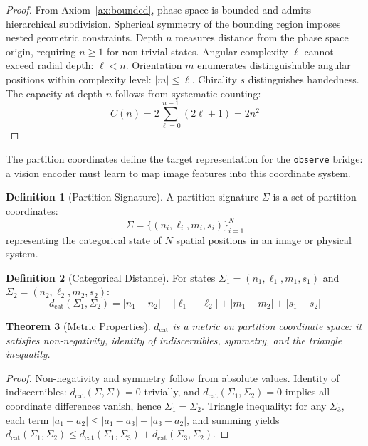 \documentclass[11pt,twocolumn,a4paper]{article}
\newtheorem{theorem}{Theorem}[section]
\theoremstyle{definition}
\newtheorem{definition}[theorem]{Definition}
\theoremstyle{remark}
\newcommand{\dcat}{d_{\mathrm{cat}}}
\newcommand{\Sig}{\Sigma}
\begin{document}
\begin{proof}
From Axiom~\ref{ax:bounded}, phase space is bounded and admits hierarchical subdivision. Spherical symmetry of the bounding region imposes nested geometric constraints. Depth $n$ measures distance from the phase space origin, requiring $n \geq 1$ for non-trivial states. Angular complexity $\ell$ cannot exceed radial depth: $\ell < n$. Orientation $m$ enumerates distinguishable angular positions within complexity level: $|m| \leq \ell$. Chirality $s$ distinguishes handedness. The capacity at depth $n$ follows from systematic counting:
\begin{equation}
C(n) = 2\sum_{\ell=0}^{n-1}(2\ell + 1) = 2n^2
\end{equation}
\end{proof}

The partition coordinates define the target representation for the \texttt{observe} bridge: a vision encoder must learn to map image features into this coordinate system.

\begin{definition}[Partition Signature]
\label{def:signature}
A partition signature $\Sig$ is a set of partition coordinates:
\begin{equation}
\Sig = \{(n_i, \ell_i, m_i, s_i)\}_{i=1}^{N}
\end{equation}
representing the categorical state of $N$ spatial positions in an image or physical system.
\end{definition}

\begin{definition}[Categorical Distance]
\label{def:cat_distance}
For states $\Sig_1 = (n_1, \ell_1, m_1, s_1)$ and $\Sig_2 = (n_2, \ell_2, m_2, s_2)$:
\begin{equation}
\dcat(\Sig_1, \Sig_2) = |n_1 - n_2| + |\ell_1 - \ell_2| + |m_1 - m_2| + |s_1 - s_2|
\end{equation}
\end{definition}

\begin{theorem}[Metric Properties]
$\dcat$ is a metric on partition coordinate space: it satisfies non-negativity, identity of indiscernibles, symmetry, and the triangle inequality.
\end{theorem}

\begin{proof}
Non-negativity and symmetry follow from absolute values. Identity of indiscernibles: $\dcat(\Sig, \Sig) = 0$ trivially, and $\dcat(\Sig_1, \Sig_2) = 0$ implies all coordinate differences vanish, hence $\Sig_1 = \Sig_2$. Triangle inequality: for any $\Sig_3$, each term $|a_1 - a_2| \leq |a_1 - a_3| + |a_3 - a_2|$, and summing yields $\dcat(\Sig_1, \Sig_2) \leq \dcat(\Sig_1, \Sig_3) + \dcat(\Sig_3, \Sig_2)$.
\end{proof}
\end{document}
